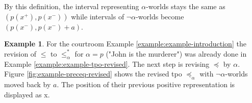 \documentclass[english, 12pt]{scrartcl}
\theoremstyle{definition}
\newtheorem{example}{Example}
\theoremstyle{definition}
\theoremstyle{definition}
\begin{document}
By this definition, the interval representing $\alpha$-worlds stays the same as $(p(x^{+}), p(x^{-}))$ while intervals of $\neg\alpha$-worlds become $(p(x^{-}), p(x^{-}) + a)$.

\begin{example}
    \label{example:example-preceq-revised}
    For the courtroom Example \ref{example:example-introduction} the revision of $\leq$ to $\leq_{\alpha}^{\ast}$ for $\alpha = p$ ("John is the murderer") was already done in Example \ref{example:example-tpo-revised}. The next step is revising $\preceq$ by $\alpha$. Figure \ref{fig:example-preceq-revised} shows the revised tpo $\preceq_{\alpha}$ with $\neg\alpha$-worlds moved back by $a$. The position of their previous positive representation is displayed as x.
    
    \begin{figure}[H]
            \centering
\end{figure}
\end{example}
\end{document}
